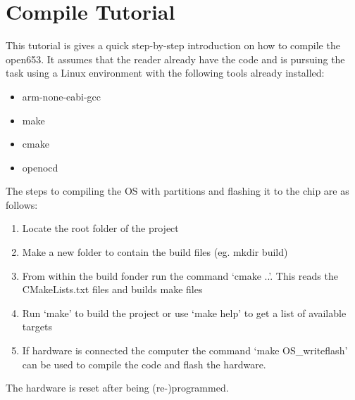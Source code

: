 \chapter{Compile Tutorial}
\label{app:tutorial}
This tutorial is gives a quick step-by-step introduction on how to compile the open653.
It assumes that the reader already have the code and is pursuing the task using a Linux environment
with the following tools already installed:

\begin{itemize}
	\item arm-none-eabi-gcc
	\item make
	\item cmake
	\item openocd
\end{itemize}

The steps to compiling the OS with partitions and
flashing it to the chip are as follows:

\begin{enumerate}
	\item Locate the root folder of the project
	\item Make a new folder to contain the build files (eg. mkdir build)
	\item From within the build fonder run the command `cmake ..'.
		This reads the CMakeLists.txt files and builds make files
	\item Run `make' to build the project or use `make help' to get a list of available targets
	\item If hardware is connected the computer the command `make OS\_writeflash'
		can be used to compile the code and flash the hardware.
\end{enumerate}

The hardware is reset after being (re-)programmed.

